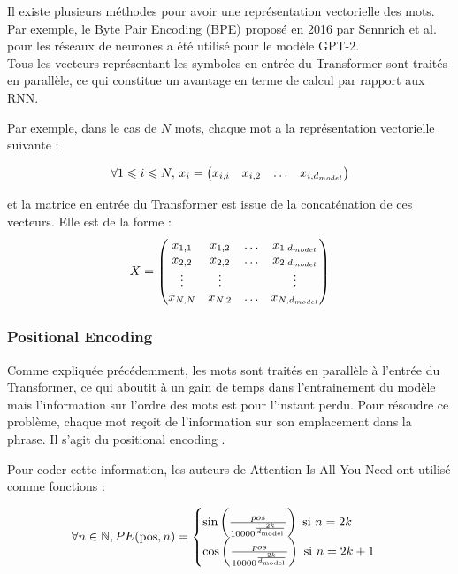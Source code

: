 Il existe plusieurs méthodes pour avoir une représentation vectorielle des mots. 
Par exemple, le Byte Pair Encoding (BPE)\cite{sennrich2016bpe} proposé en 2016 par Sennrich et al. pour 
les réseaux de neurones a été utilisé pour le modèle GPT-2\cite{radford2019gpt2}. \\


Tous les vecteurs représentant les symboles en entrée du Transformer sont traités en parallèle, 
ce qui constitue un avantage en terme de calcul par rapport aux RNN. 

Par exemple, dans le cas de $N$ mots, 
chaque mot a la représentation vectorielle suivante : 

\[ \forall 1 \leqslant i \leqslant N , \, x_i = 
\begin{pmatrix}
  x_{i,i} & x_{i,2} & \ldots & x_{i,d_{model}}
\end{pmatrix}
 \]

et la matrice en entrée du Transformer est issue de la concaténation de ces vecteurs. Elle est de la forme :
\[ X = 
\begin{pmatrix}
  x_{1,1} & x_{1,2} & \ldots & x_{1,d_{model}} \\
  x_{2,2} & x_{2,2} & \ldots & x_{2,d_{model}} \\
  \vdots  & \vdots  &        & \vdots \\
  x_{N,N} & x_{N,2} & \ldots & x_{N,d_{model}}
\end{pmatrix}
\]

\subsubsection{Positional Encoding}

Comme expliquée précédemment, les mots sont traités en parallèle à l'entrée du Transformer, ce qui aboutit à un gain de
temps dans l'entrainement du modèle mais l'information sur l'ordre des mots est pour l'instant perdu. Pour résoudre
ce problème, chaque mot reçoit de l'information sur son emplacement dans la phrase. Il s'agit du \og positional encoding \fg{}.

Pour coder cette information, les auteurs de \og Attention Is All You Need \fg{} \cite{vaswani2017attention} ont utilisé comme fonctions :

\[ \forall n \in \mathbb{N}, PE(\text{pos}, n) = 
\begin{cases}
  \sin\left( \frac{pos}{10 000^{ \frac{2k}{d_\text{model}}}} \right) \text{ si } n = 2k\\
  \cos\left( \frac{pos}{10 000^{ \frac{2k}{d_\text{model}}}} \right) \text{ si } n = 2k+1 \\
\end{cases} \]

